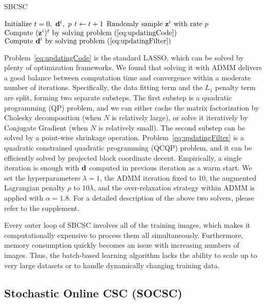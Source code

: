 \begin{algorithm}[H]
\caption{SBCSC} \label{algo:SBCSC}
\begin{algorithmic}[1]
\State $\text{Initialize}  ~ \ite=0, ~\filter^t, ~p$
    \State $t \gets t+1$
    \State $ \text{Randomly sample }\code^{\ite} \text{ with rate } p $
        \State $ \text{Compute } (\code^i)^{\ite} \text{ by solving problem~(\ref{eq:updatingCode}})$
    \EndFor
    \State $\text{Compute } \filter^{\ite} \text{ by solving problem~(\ref{eq:updatingFilter}})$
\EndWhile
\end{algorithmic}
\end{algorithm}


Problem~\eqref{eq:updatingCode} is the standard LASSO, which can be
solved by plenty of optimization frameworks. We found that solving it
with ADMM delivers a good balance between computation time and
convergence within a moderate number of iterations. Specifically, the
data fitting term and the $L_1$ penalty term are split, forming two
separate substeps. The first substep is a quadratic programming (QP)
problem, and we can either cache the matrix factorization by Cholesky
decomposition (when $N$ is relatively large), or solve it iteratively
by Conjugate Gradient (when $N$ is relatively small). The second
substep can be solved by a point-wise shrinkage operation.
Problem~\ref{eq:updatingFilter} is a quadratic constrained
quadratic programming (QCQP) problem, and it can be efficiently solved
by projected block coordinate decent. Empirically, a single iteration
is enough with $\filter$ computed in previous iteration as a warm
start. We set the hyperparameters $\lambda=1$, the ADMM iteration
fixed to 10, the augmented Lagrangian penalty $\rho$ to $10 \lambda$,
and the over-relaxation strategy within ADMM is applied with $\alpha =
1.8$. For a detailed description of the above two solvers, please
refer to the supplement.

Every outer loop of SBCSC involves all of the training images, which
makes it computationally expensive to process them all simultaneously.
Furthermore, memory consumption quickly becomes an issue with
increasing numbers of images. Thus, the batch-based learning algorithm
lacks the ability to scale up to very large datasets or to handle
dynamically changing training data.


\subsection{Stochastic Online CSC (SOCSC)}

